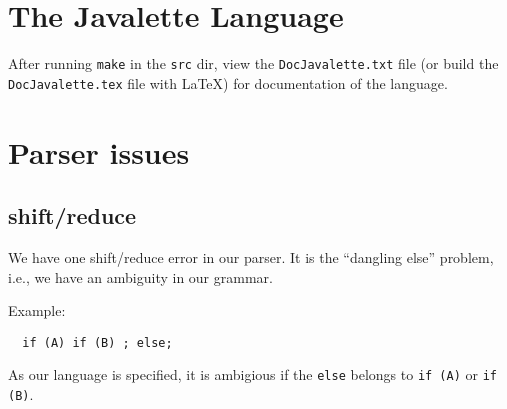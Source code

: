 \documentclass[a4paper,10pt]{article}
\begin{document}
\section{The Javalette Language}
After running \texttt{make} in the \texttt{src} dir, view the
\texttt{DocJavalette.txt} file (or build the \texttt{DocJavalette.tex}
file with \LaTeX) for documentation of the language.

\section{Parser issues}
\subsection{shift/reduce}
We have one shift/reduce error in our parser. It is the ``dangling else''
problem, i.e., we have an ambiguity in our grammar. 

Example:
\begin{lstlisting}
  if (A) if (B) ; else;
\end{lstlisting}

As our language is specified, it is ambigious if the \texttt{else}
belongs to \texttt{if (A)} or \texttt{if (B)}.
\end{document}
